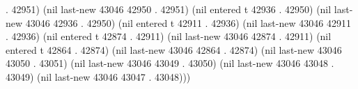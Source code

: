 . 42951) (nil last-new 43046 42950 . 42951) (nil entered t 42936 . 42950) (nil last-new 43046 42936 . 42950) (nil entered t 42911 . 42936) (nil last-new 43046 42911 . 42936) (nil entered t 42874 . 42911) (nil last-new 43046 42874 . 42911) (nil entered t 42864 . 42874) (nil last-new 43046 42864 . 42874) (nil last-new 43046 43050 . 43051) (nil last-new 43046 43049 . 43050) (nil last-new 43046 43048 . 43049) (nil last-new 43046 43047 . 43048)))
